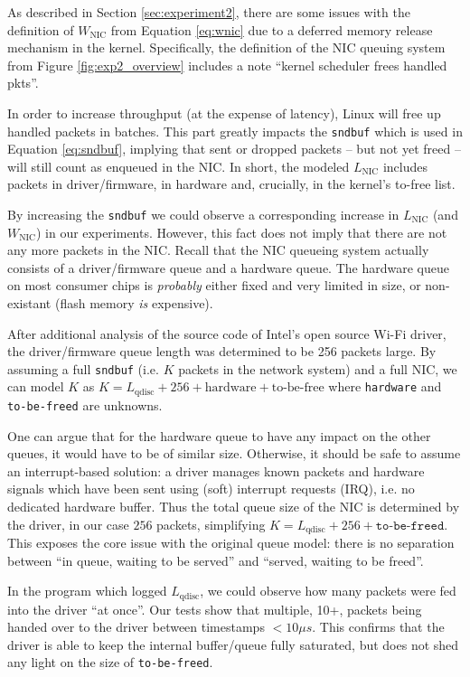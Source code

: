 As described in Section \ref{sec:experiment2}, there are some issues with the
definition of $W_\text{NIC}$ from Equation \ref{eq:wnic} due to a deferred
memory release mechanism in the kernel. Specifically, the definition of the
NIC queuing system from Figure \ref{fig:exp2_overview} includes a note
``kernel scheduler frees handled pkts''.

In order to increase throughput (at the expense of latency), Linux will free
up handled packets in batches. This part greatly impacts the \texttt{sndbuf}
which is used in Equation \ref{eq:sndbuf}, implying that sent or dropped
packets -- but not yet freed -- will still count as enqueued in the NIC. In
short, the modeled $L_\text{NIC}$ includes packets in driver/firmware, in
hardware and, crucially, in the kernel's to-free list.

By increasing the \texttt{sndbuf} we could observe a corresponding increase in
$L_\text{NIC}$ (and $W_\text{NIC}$) in our experiments. However, this fact
does not imply that there are not any more packets in the NIC. Recall that the
NIC queueing system actually consists of a driver/firmware queue and a
hardware queue. The hardware queue on most consumer chips is \emph{probably}
either fixed and very limited in size, or non-existant (flash memory \emph{is}
expensive).

After additional analysis of the source code of Intel's open source Wi-Fi
driver, the driver/firmware queue length was determined to be 256 packets
large. By assuming a full \texttt{sndbuf} (i.e. $K$ packets in the network
system) and a full NIC, we can model $K$ as $K = L_\text{qdisc} + 256 +
\text{hardware} + \text{to-be-free}$ where \texttt{hardware} and
\texttt{to-be-freed} are unknowns.

One can argue that for the hardware queue to have any impact on the other
queues, it would have to be of similar size. Otherwise, it should be safe to
assume an interrupt-based solution: a driver manages known packets and
hardware signals which have been sent using (soft) interrupt requests (IRQ),
i.e. no dedicated hardware buffer. Thus the total queue size of the NIC is
determined by the driver, in our case $256$ packets, simplifying $K =
L_\text{qdisc} + 256 + \texttt{to-be-freed}$. This exposes the core issue with
the original queue model: there is no separation between ``in queue, waiting
to be served'' and ``served, waiting to be freed''.

In the program which logged $L_\text{qdisc}$, we could observe how many
packets were fed into the driver ``at once''. Our tests show that multiple,
10+, packets being handed over to the driver between timestamps $<10 \mu s$.
This confirms that the driver is able to keep the internal buffer/queue fully
saturated, but does not shed any light on the size of \texttt{to-be-freed}.

